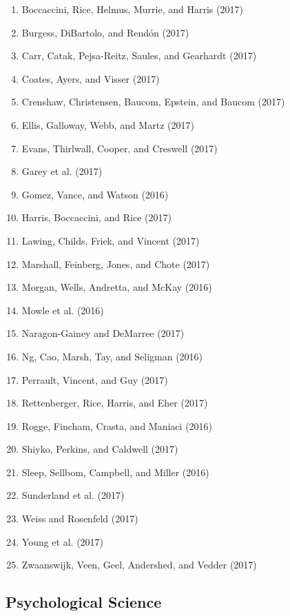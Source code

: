 \documentclass[english,man]{apa6}
\providecommand{\tightlist}{%
  \setlength{\itemsep}{0pt}\setlength{\parskip}{0pt}}
\theoremstyle{definition}
\theoremstyle{definition}
\theoremstyle{definition}
\theoremstyle{remark}
\begin{document}
\begin{enumerate}
\def\labelenumi{\arabic{enumi})}
\tightlist
\item
  Boccaccini, Rice, Helmus, Murrie, and Harris (2017)
\item
  Burgess, DiBartolo, and Rendón (2017)
\item
  Carr, Catak, Pejsa-Reitz, Saules, and Gearhardt (2017)
\item
  Coates, Ayers, and Visser (2017)
\item
  Crenshaw, Christensen, Baucom, Epstein, and Baucom (2017)
\item
  Ellis, Galloway, Webb, and Martz (2017)
\item
  Evans, Thirlwall, Cooper, and Creswell (2017)
\item
  Garey et al. (2017)
\item
  Gomez, Vance, and Watson (2016)
\item
  Harris, Boccaccini, and Rice (2017)
\item
  Lawing, Childs, Frick, and Vincent (2017)
\item
  Marshall, Feinberg, Jones, and Chote (2017)
\item
  Morgan, Wells, Andretta, and McKay (2016)
\item
  Mowle et al. (2016)
\item
  Naragon-Gainey and DeMarree (2017)
\item
  Ng, Cao, Marsh, Tay, and Seligman (2016)
\item
  Perrault, Vincent, and Guy (2017)
\item
  Rettenberger, Rice, Harris, and Eher (2017)
\item
  Rogge, Fincham, Crasta, and Maniaci (2016)
\item
  Shiyko, Perkins, and Caldwell (2017)
\item
  Sleep, Sellbom, Campbell, and Miller (2016)
\item
  Sunderland et al. (2017)
\item
  Weiss and Rosenfeld (2017)
\item
  Young et al. (2017)
\item
  Zwaanswijk, Veen, Geel, Andershed, and Vedder (2017)
\end{enumerate}

\subsection{Psychological Science}\label{psychological-science}
\end{document}
